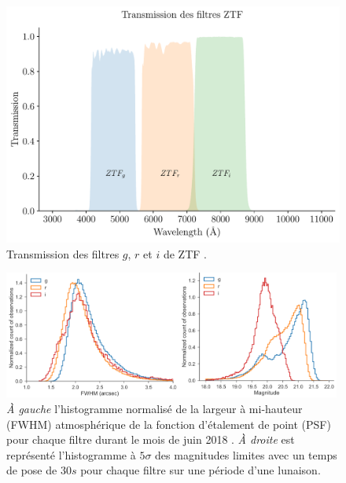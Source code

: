 \documentclass[../main/main.tex]{subfiles}
\begin{document}
\begin{figure}[ht]
  \begin{minipage}[c]{0.55\textwidth}
    \includegraphics[width=\textwidth]{../figures/02_ztf/ZTFfilters.pdf}
  \end{minipage}\hfill
  \begin{minipage}[c]{0.45\textwidth}
    \caption[Transmission des filtres $g$, $r$ et $i$ de
    ZTF]{Transmission des filtres $g$, $r$ et $i$ de ZTF \citep{DekanyZTF2020}.}\label{fig:ztffilters}
  \end{minipage}
\end{figure}



\begin{figure}[h]
  \centering
  \includegraphics[width=0.99\textwidth]{../figures/02_ztf/ztfperformances.pdf}
  \caption[Profondeurs et FWHM associées aux filtres de la caméra
  ZTF]{\textit{À gauche} l'histogramme
    normalisé de la largeur à mi-hauteur (FWHM) atmosphérique de la fonction
    d'étalement de point (PSF) pour chaque filtre durant le mois de juin
    2018 \citep{BellmZTF2019}. \textit{À droite} est représenté
    l'histogramme à $5\sigma$ des magnitudes limites avec un temps de
    pose de $30s$ pour chaque filtre sur une période d'une lunaison.}
  \label{fig:ztfperffilts}
\end{figure}
\end{document}
